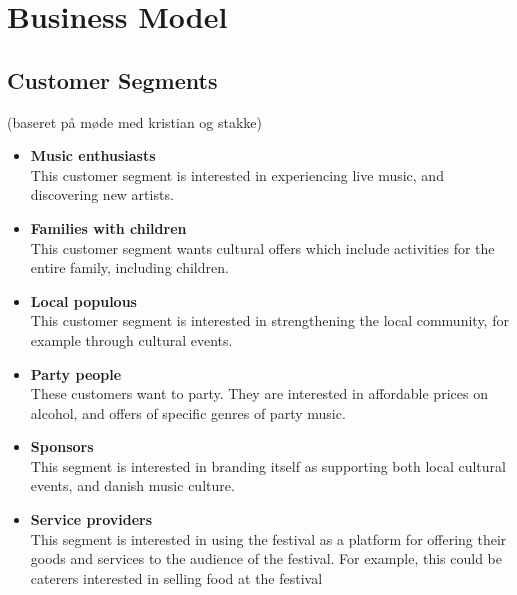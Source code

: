 \section{Business Model} %
\label{sec:business_model}
\subsection{Customer Segments} %
\label{sub:customer_segments}
(baseret på møde med kristian og stakke)
\begin{itemize}
	\item \textbf{Music enthusiasts}\\
			This customer segment is interested in experiencing live music, and discovering new artists.
	\item \textbf{Families with children}\\
			This customer segment wants cultural offers which include activities for the entire family, including children.
	\item \textbf{Local populous}\\
			This customer segment is interested in strengthening the local community, for example through cultural events. 
	\item \textbf{Party people}\\
			These customers want to party. They are interested in affordable prices on alcohol, and offers of specific genres of party music.
	\item \textbf{Sponsors}\\
			This segment is interested in branding itself as supporting both local cultural events, and danish music culture.
	\item \textbf{Service providers}\\
		This segment is interested in using the festival as a platform for offering their goods and services to the audience of the festival. For example, this could be caterers interested in selling food at the festival
\end{itemize}
